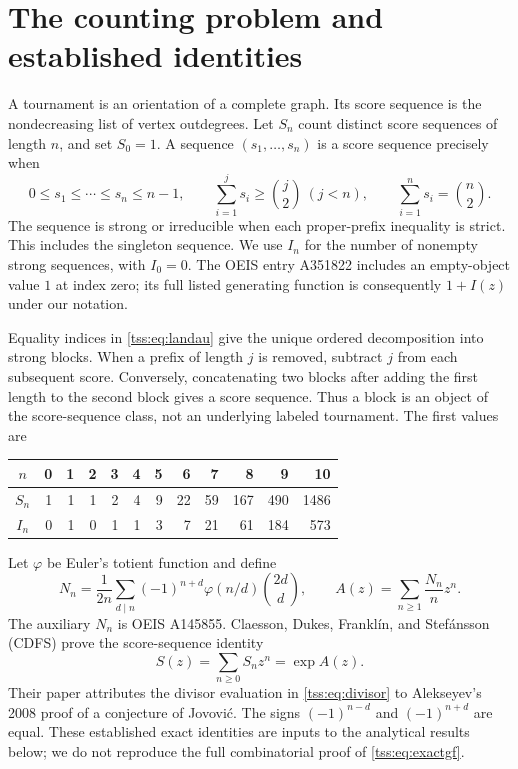 \documentclass[11pt]{article}
\theoremstyle{remark}\newtheorem{remark}[theorem]{Remark}
\theoremstyle{definition}\newtheorem{definition}[theorem]{Definition}
\begin{document}
\section{The counting problem and established identities}
\label{tss:sec:exact}
A tournament is an orientation of a complete graph. Its score sequence is the nondecreasing list of vertex outdegrees. Let $S_n$ count distinct score sequences of length $n$, and set $S_0=1$. A sequence $(s_1,\ldots,s_n)$ is a score sequence precisely when
\begin{equation}\label{tss:eq:landau}
0\leq s_1\leq\cdots\leq s_n\leq n-1,\qquad
\sum_{i=1}^j s_i\geq \binom{j}{2}\ (j<n),\qquad
\sum_{i=1}^n s_i=\binom{n}{2}.
\end{equation}
The sequence is strong or irreducible when each proper-prefix inequality is strict. This includes the singleton sequence. We use $I_n$ for the number of nonempty strong sequences, with $I_0=0$. The OEIS entry A351822 includes an empty-object value $1$ at index zero; its full listed generating function is consequently $1+I(z)$ under our notation.

Equality indices in \eqref{tss:eq:landau} give the unique ordered decomposition into strong blocks. When a prefix of length $j$ is removed, subtract $j$ from each subsequent score. Conversely, concatenating two blocks after adding the first length to the second block gives a score sequence. Thus a block is an object of the score-sequence class, not an underlying labeled tournament. The first values are
\begin{center}
\begin{tabular}{c|rrrrrrrrrrr}
$n$&0&1&2&3&4&5&6&7&8&9&10\\\hline
$S_n$&1&1&1&2&4&9&22&59&167&490&1486\\
$I_n$&0&1&0&1&1&3&7&21&61&184&573
\end{tabular}
\end{center}

Let $\varphi$ be Euler's totient function and define
\begin{equation}\label{tss:eq:divisor}
N_n=\frac1{2n}\sum_{d\mid n}(-1)^{n+d}\varphi(n/d)\binom{2d}{d},
\qquad A(z)=\sum_{n\geq1}\frac{N_n}{n}z^n.
\end{equation}
The auxiliary $N_n$ is OEIS A145855. Claesson, Dukes, Frankl\'in, and Stef\'ansson (CDFS) prove the score-sequence identity \cite[Corollaries 12--13]{CDFS}
\begin{equation}\label{tss:eq:exactgf}
S(z)=\sum_{n\geq0}S_nz^n=\exp A(z).
\end{equation}
Their paper attributes the divisor evaluation in \eqref{tss:eq:divisor} to Alekseyev's 2008 proof of a conjecture of Jovovi\'c. The signs $(-1)^{n-d}$ and $(-1)^{n+d}$ are equal. These established exact identities are inputs to the analytical results below; we do not reproduce the full combinatorial proof of \eqref{tss:eq:exactgf}.
\end{document}
